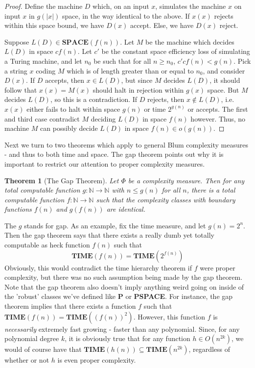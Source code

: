 \documentclass{article}
\theoremstyle{definition}
\theoremstyle{plain}
\theoremstyle{theorem}
\newtheorem{theorem}{Theorem}[section]
\begin{document}
\begin{proof}
 	Define the machine $D$ which, on an input $x$, simulates the machine $x$ on input $x$ in $g(|x|)$ space, in the way identical to the above. If $x(x)$ rejects within this space bound, we have $D(x)$ accept. Else, we have $D(x)$ reject. 
 	\par Suppose $L(D) \in \textbf{SPACE}(f(n))$. Let $M$ be the machine which decides $L(D)$ in space $cf(n)$. Let $c'$ be the constant space efficiency loss of simulating a Turing machine, and let $n_0$ be such that for all $n \geq n_0$, $c'cf(n) < g(n)$. Pick a string $x$ coding $M$ which is of length greater than or equal to $n_0$, and consider $D(x)$. If $D$ accepts, then $x \in L(D)$, but since $M$ decides $L(D)$, it should follow that $x(x) = M(x)$ should halt in rejection within $g(x)$ space. But $M$ decides $L(D)$, so this is a contradiction. If $D$ rejects, then $x \notin L(D)$, i.e. $x(x)$ either fails to halt within space $g(n)$ or time $2^{g(n)}$ or accepts. The first and third case contradict $M$ deciding $L(D)$ in space $f(n)$ however. Thus, no machine $M$ can possibly decide $L(D)$ in space $f(n) \in o(g(n))$.
\end{proof}
Next we turn to two theorems which apply to general Blum complexity measures - and thus to both time and space. The gap theorem points out why it is important to restrict our attention to proper complexity measures.
\begin{theorem}[The Gap Theorem]
	Let $\Phi$ be a complexity measure. Then for any total computable function $g:\mathbb{N} \to \mathbb{N}$ with $n \leq g(n)$ for all $n$, there is a total computable function $f:\mathbb{N} \to \mathbb{N}$ such that the complexity classes with boundary functions $f(n)$ and $g(f(n))$ are identical.
\end{theorem}
The $g$ stands for gap. As an example, fix the time measure, and let $g(n) = 2^n$. Then the gap theorem says that there exists a really dumb yet totally computable as heck function $f(n)$ such that 
\[ \textbf{TIME}(f(n)) = \textbf{TIME}(2^{f(n)}) \]
Obviously, this would contradict the time hierarchy theorem if $f$ were proper complexity, but there was no such assumption being made by the gap theorem. Note that the gap theorem also doesn't imply anything weird going on inside of the 'robust' classes we've defined like \textbf{P} or \textbf{PSPACE}. For instance, the gap theorem implies that there exists a function $f$ such that $\textbf{TIME}(f(n)) = \textbf{TIME}((f(n))^2)$. However, this function $f$ is \textit{necessarily} extremely fast growing - faster than any polynomial. Since, for any polynomial degree $k$, it is obviously true that for any function $h \in O(n^{2k})$, we would of course have that $\textbf{TIME}(h(n)) \subseteq \textbf{TIME}(n^{2k})$, regardless of whether or not $h$ is even proper complexity.
\end{document}
